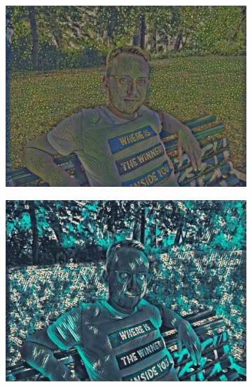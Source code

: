 \begin{figure}[H]
\begin{subfigure}[h]{0.13\textwidth}
        \includegraphics[width=\textwidth]{resources/content/experiments/ich-vgg16_portrait_of_joseph_roulin.jpg}
    \end{subfigure}
    \begin{subfigure}[h]{0.13\textwidth}
        \centering
        \includegraphics[width=\textwidth]{resources/content/experiments/ich-vgg16_teal_and_black_abstract_painting.jpg}
    \end{subfigure}
    \begin{subfigure}[h]{0.13\textwidth}
        \centering

\end{subfigure}
\end{figure}
